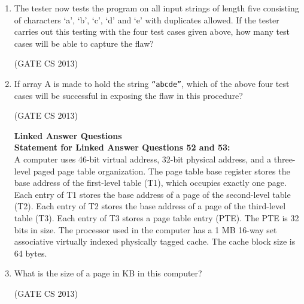 \documentclass[a4paper, 11pt]{article}
\begin{document}
\begin{enumerate}
     \item The tester now tests the program on all input strings of length five consisting of characters ‘a’, ‘b’, ‘c’, ‘d’ and ‘e’ with duplicates allowed. If the tester carries out this testing with the four test cases given above, how many test cases will be able to capture the flaw?
     \begin{enumerate}
     \end{enumerate}
     \hfill (GATE CS 2013)

     \item If array A is made to hold the string \texttt{“abcde”}, which of the above four test cases will be successful in exposing the flaw in this procedure? 
     \begin{enumerate}
     \end{enumerate}
     \hfill (GATE CS 2013)

    \textbf{Linked Answer Questions}\\
    \textbf{Statement for Linked Answer Questions 52 and 53: }\\
    A computer uses 46-bit virtual address, 32-bit physical address, and a three-level paged page table organization. The page table base register stores the base address of the first-level table (T1), which occupies exactly one page. Each entry of T1 stores the base address of a page of the second-level table (T2). Each entry of T2 stores the base address of a page of the third-level table (T3). Each entry of T3 stores a page table entry (PTE). The PTE is 32 bits in size. The processor used in the computer has a 1 MB 16-way set associative virtually indexed physically tagged cache. The cache block size is 64 bytes.
    \item What is the size of a page in KB in this computer? 
    \begin{enumerate}
     \end{enumerate}
     \hfill (GATE CS 2013)


\end{enumerate}
\end{document}
